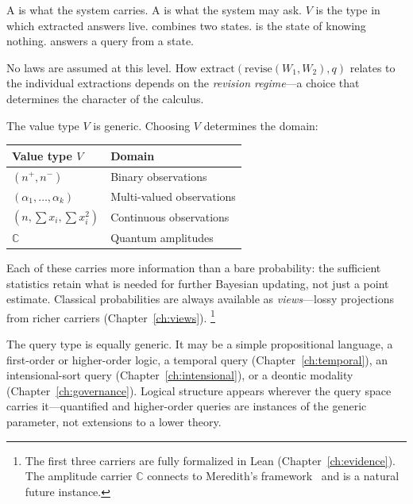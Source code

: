 \documentclass[11pt,openany]{report}
\begin{document}
\noindent
A  is what the system carries.  A  is what
the system may ask.  $V$ is the type in which extracted answers live.
 combines two states.   is the state of
knowing nothing.   answers a query from a state.

No laws are assumed at this level.  How
$\mathrm{extract}(\mathrm{revise}(W_1, W_2), q)$
relates to the individual extractions depends on the \emph{revision
regime}---a choice that determines the character of the calculus.

The value type $V$ is generic.  Choosing $V$ determines the domain:

\medskip
\begin{center}
\begin{tabular}{ll}
\toprule
\textbf{Value type $V$} & \textbf{Domain} \\
\midrule
$(n^+, n^-)$ & Binary observations \\
$(\alpha_1,\ldots,\alpha_k)$ & Multi-valued observations \\
$(n, \textstyle\sum x_i, \sum x_i^2)$ & Continuous observations \\
$\mathbb{C}$ & Quantum amplitudes \\
\bottomrule
\end{tabular}
\end{center}
\medskip

\noindent
Each of these carries more information than a bare probability: the
sufficient statistics retain what is needed for further Bayesian
updating, not just a point estimate.  Classical probabilities are
always available as \emph{views}---lossy projections from richer
carriers (Chapter~\ref{ch:views}).%
\footnote{The first three carriers are fully formalized in Lean
(Chapter~\ref{ch:evidence}).  The amplitude carrier $\mathbb{C}$
connects to Meredith's framework~\cite{meredith2026ccc} and is a
natural future instance.}

\noindent
The query type is equally generic.  It may be a simple propositional
language, a first-order or higher-order logic, a temporal query
(Chapter~\ref{ch:temporal}), an intensional-sort query
(Chapter~\ref{ch:intensional}), or a deontic modality
(Chapter~\ref{ch:governance}).  Logical structure appears wherever
the query space carries it---quantified and higher-order queries are
instances of the generic  parameter, not extensions to a
lower theory.
\end{document}
